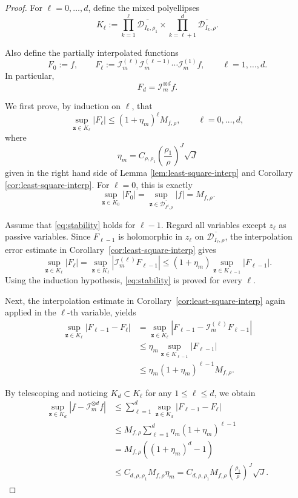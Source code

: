 \documentclass{article}
\numberwithin{equation}{section}
\def\lt{\left}
\def\rt{\right}
\begin{document}
\begin{proof}

For \(\ell=0,\dots,d\), define the mixed polyellipses
\[
K_\ell
:=
\prod_{k=1}^\ell \overline{\mathcal{D}_{I_k,\rho_1}}
\times
\prod_{k=\ell+1}^d \overline{\mathcal{D}_{I_k,\rho}}.
\]

Also define the partially interpolated functions
\[
F_0:=f,
\qquad
F_\ell
:=
\mathcal{I}_m^{(\ell)}\mathcal{I}_m^{(\ell-1)}\cdots\mathcal{I}_m^{(1)}f,
\qquad \ell=1,\dots,d.
\]
In particular,
\[
F_d=\mathcal{I}_m^{\otimes d}f.
\]

We first prove, by induction on \(\ell\), that
\begin{equation}
\label{eq:stability}
\sup_{{\bm z}\in K_\ell} |F_\ell|
\leq
(1+\eta_m)^\ell M_{f,\rho},
\qquad \ell=0,\dots,d,
\end{equation}
where $$\eta_m = C_{\rho,\rho_1}\lt(\frac{\rho_1}{\rho}\rt)^J\sqrt{J}$$ 
given in the right hand side of Lemma \ref{lem:least-square-interp} and Corollary \ref{cor:least-square-interp}.
For \(\ell=0\), this is exactly
\[
\sup_{{\bm z}\in K_0} |F_0|
=
\sup_{{\bm z}\in \overline{\mathcal{D}_{I^d,\rho}}} |f|
=
M_{f,\rho}.
\]

Assume that \eqref{eq:stability} holds for \(\ell-1\). Regard all variables
except \(z_\ell\) as passive variables. Since \(F_{\ell-1}\) is holomorphic
in \(z_\ell\) on \(\overline{\mathcal{D}_{I_\ell,\rho}}\), the interpolation error
estimate in Corollary~\ref{cor:least-square-interp} gives
\[
\sup_{{\bm z}\in K_\ell} |F_\ell|
=
\sup_{{\bm z}\in K_\ell} \lt|\mathcal{I}_m^{(\ell)}F_{\ell-1}\rt|
\le
(1+\eta_m) \sup_{{\bm z}\in K_{\ell-1}} |F_{\ell-1}|.
\]
Using the induction hypothesis,
\eqref{eq:stability} is proved for every \(\ell\).

Next, the interpolation estimate in Corollary~\ref{cor:least-square-interp} again applied in
the \(\ell\)-th variable, yields
\begin{equation}
\begin{split}
\sup_{{\bm z}\in K_\ell} |F_{\ell-1}-F_\ell| 
&=
\sup_{{\bm z}\in K_\ell} \lt|F_{\ell-1}-\mathcal{I}_m^{(\ell)}F_{\ell-1}\rt|
\\
&\le
\eta_m \sup_{{\bm z}\in K_{\ell-1}} |F_{\ell-1}| 
\\
&\le
\eta_m(1+\eta_m)^{\ell-1} M_{f,\rho}.
\end{split}
\end{equation}

By telescoping and noticing $K_d\subset K_\ell$ for any $1\leq \ell\leq d$, we obtain
\begin{equation}
\begin{split}
\sup_{{\bm z}\in K_d} \lt|f-\mathcal{I}_m^{\otimes d}f \rt|
&\le
\sum_{\ell=1}^{d}
\sup_{{\bm z}\in K_d} |F_{\ell-1}-F_\ell| \\
&\le
M_{f,\rho}
\sum_{\ell=1}^{d}
\eta_m(1+\eta_m)^{\ell-1} \\
&=
M_{f,\rho}\lt( (1+\eta_m)^d-1 \rt)  \\ 
&\leq C_{d,\rho,\rho_1} M_{f,\rho} \eta_m = C_{d,\rho,\rho_1} M_{f,\rho} \lt(\frac{\rho_1}{\rho}\rt)^J \sqrt{J}.
\end{split}
\end{equation}
\end{proof}
\end{document}
